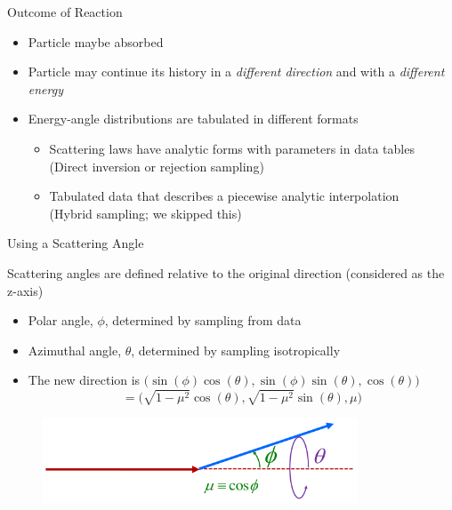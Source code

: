 \documentclass[xcolor=x11names,compress]{beamer}
\renewcommand{\(}{\begin{columns}}
\renewcommand{\)}{\end{columns}}
\newcommand{\<}[1]{\begin{column}{#1}}
\renewcommand{\>}{\end{column}}
\begin{document}
\begin{frame}{Outcome of Reaction}

\begin{itemize}
    \item Particle maybe absorbed
\vspace*{1em}
    \item Particle may continue its history in a \textit{different direction} and with a \textit{different energy}
\vspace*{1em}
    \item Energy-angle distributions are tabulated in different formats
    \begin{itemize}
      \item Scattering laws have analytic forms with parameters in data tables\\
      (Direct inversion or rejection sampling)
      \item Tabulated data that describes a piecewise analytic interpolation\\
      (Hybrid sampling; we skipped this)
    \end{itemize}
\end{itemize}

\end{frame}


\begin{frame}{Using a Scattering Angle}

Scattering angles are defined relative to the original direction (considered as the z-axis)

\begin{itemize}
    \item Polar angle, $\phi$, determined by sampling from data
\vspace*{0.5em}
    \item Azimuthal angle, $\theta$, determined by sampling isotropically
    \vspace*{0.5em}
    \item The new direction is $\bigl(\sin(\phi) \cos(\theta), \sin(\phi) \sin(\theta), \cos(\theta)\bigr)$ \[= \bigl(\sqrt{1 - \mu^2} \cos(\theta),  \sqrt{1 - \mu^2} \sin(\theta), \mu \bigr)\]
\end{itemize}

  	\begin{figure}
  	\begin{center}
  		\includegraphics[height=1in,clip]{scattering-angle-2}
	\end{center}
  	\end{figure}

\end{frame}
\end{document}
